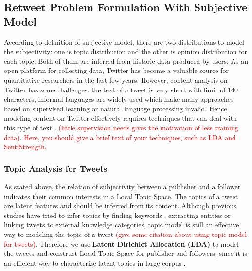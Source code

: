 \documentclass{acm_proc_article-sp}
\newcommand{\mo}[1]{\textcolor{red}{#1}}
\begin{document}
\subsection{Retweet Problem Formulation With Subjective Model}
\label{concrete}
According to definition of subjective model, there are two distributions to model the subjectivity: one is topic distribution and the other is opinion distribution for each topic. Both of them are inferred from historic data produced by users.
As an open platform for collecting data, Twitter has become a valuable source for quantitative researchers in the last few years.
However, content analysis on Twitter has some challenges: the text of a tweet is very short with limit of 140 characters, informal languages are widely used which make many approaches based on supervised learning or natural language processing invalid. 
Hence modeling content on Twitter effectively requires techniques that can deal with this type of text .  \mo{ (little supervision needs gives the motivation of less training data)}.  \mo{Here, you should give a brief text of your techniques, such as LDA and SentiStrength.}
\subsubsection{Topic Analysis for Tweets}
\label{local}
As stated above, the relation of subjectivity between a publisher and a follower indicates their common interests in a Local Topic Space. 
The topics of a tweet are latent features and should be inferred from its content.
Although previous studies have tried to infer topics by finding keywords \cite{Chen:2010STE}, extracting  entities \cite{Abel:2011AUM} or linking tweets to external knowledge categories\cite{conf/icwsm/MacskassyM11},  topic model is still an effective way to modeling the topic of a tweet \mo{(give some citation about using topic model for tweets)}. Therefore we use \textbf{Latent Dirichlet Allocation (LDA)} to model the tweets and construct Local Topic Space for publisher and followers, since it is an efficient way to characterize latent topics in large corpus \cite{blei2003latent,conf/wsdm/WengLJH10}. 
\end{document}
